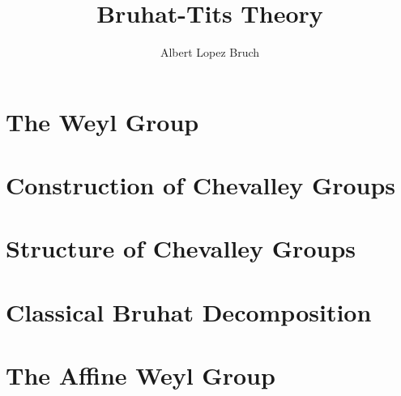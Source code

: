 \documentclass{article}
\title{Bruhat-Tits Theory}
\author{Albert Lopez Bruch}
\theoremstyle{plain}
\theoremstyle{definition}
\begin{document}
	\maketitle
	
    \section{The Weyl Group}
    

    \section{Construction of Chevalley Groups}
    

    \section{Structure of Chevalley Groups}
    

    \section{Classical Bruhat Decomposition}
    

    \section{The Affine Weyl Group}
    
\end{document}
